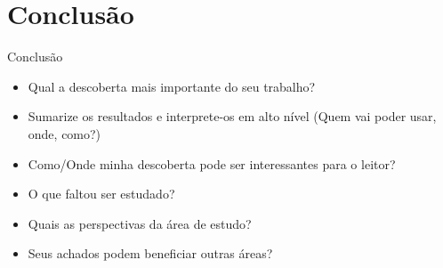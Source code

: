 \section{Conclusão}

\begin{frame}	
	\begin{block}{Conclusão}
		 \begin{itemize}
			  \item Qual a descoberta mais importante do seu trabalho?			  
			  \item Sumarize os resultados e interprete-os em alto nível (Quem vai poder usar, onde, como?)
			  \item Como/Onde minha descoberta pode ser interessantes para o leitor?
			  \item O que faltou ser estudado?
			  \item Quais as perspectivas da área de estudo?
			  \item Seus achados podem beneficiar outras áreas?
		  \end{itemize}
	\end{block}
\end{frame}
